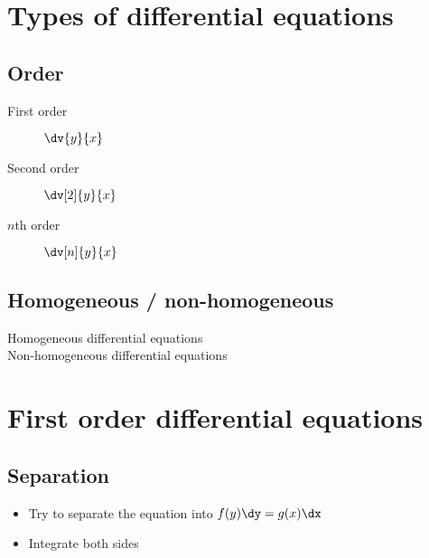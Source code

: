 \section{Types of differential equations}

\subsection{Order}
\begin{description}
    \item[First order] $\dv{y}{x}$
    \item[Second order] $\dv[2]{y}{x}$
    \item[$n$th order] $\dv[n]{y}{x}$
\end{description}

\subsection{Homogeneous / non-homogeneous}
\begin{description}
    \item[Homogeneous differential equations] 
    \item[Non-homogeneous differential equations] 
\end{description}

\section{First order differential equations}
\subsection{Separation}
\begin{itemize}
    \item Try to separate the equation into $f(y)\dy = g(x)\dx$
    \item Integrate both sides
\end{itemize}

